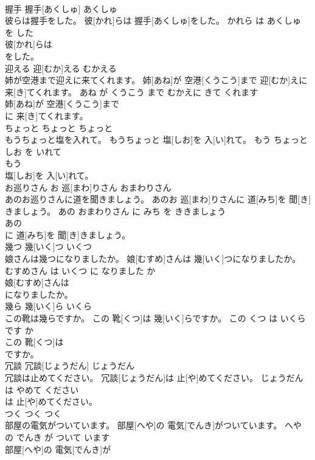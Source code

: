 \documentclass[8pt]{extreport}
\begin{document}
\begin{CJK}{UTF8}{min}
\\	握手	握手[あくしゅ]	あくしゅ	
\\	彼らは握手をした。	彼[かれ]らは 握手[あくしゅ]をした。	かれら は あくしゅ を した	
\\	彼[かれ]らは
\\	をした。			
\\	迎える	迎[むか]える	むかえる	
\\	姉が空港まで迎えに来てくれます。	姉[あね]が 空港[くうこう]まで 迎[むか]えに 来[き]てくれます。	あね が くうこう まで むかえに きて くれます	
\\	姉[あね]が 空港[くうこう]まで
\\	に 来[き]てくれます。			
\\	ちょっと	ちょっと	ちょっと	
\\	もうちょっと塩を入れて。	もうちょっと 塩[しお]を 入[い]れて。	もう ちょっと しお を いれて	
\\	もう
\\	塩[しお]を 入[い]れて。			
\\	お巡りさん	お 巡[まわ]りさん	おまわりさん	
\\	あのお巡りさんに道を聞きましょう。	あのお 巡[まわ]りさんに 道[みち]を 聞[き]きましょう。	あの おまわりさん に みち を ききましょう	
\\	あの
\\	に 道[みち]を 聞[き]きましょう。			
\\	幾つ	幾[いく]つ	いくつ	
\\	娘さんは幾つになりましたか。	娘[むすめ]さんは 幾[いく]つになりましたか。	むすめさん は いくつ に なりました か	
\\	娘[むすめ]さんは
\\	になりましたか。			
\\	幾ら	幾[いく]ら	いくら	
\\	この靴は幾らですか。	この 靴[くつ]は 幾[いく]らですか。	この くつ は いくら です か	
\\	この 靴[くつ]は
\\	ですか。			
\\	冗談	冗談[じょうだん]	じょうだん	
\\	冗談は止めてください。	冗談[じょうだん]は 止[や]めてください。	じょうだん は やめて ください	
\\	は 止[や]めてください。			
\\	つく	つく	つく	
\\	部屋の電気がついています。	部屋[へや]の 電気[でんき]がついています。	へや の でんき が ついて います	
\\	部屋[へや]の 電気[でんき]が

\end{CJK}
\end{document}
